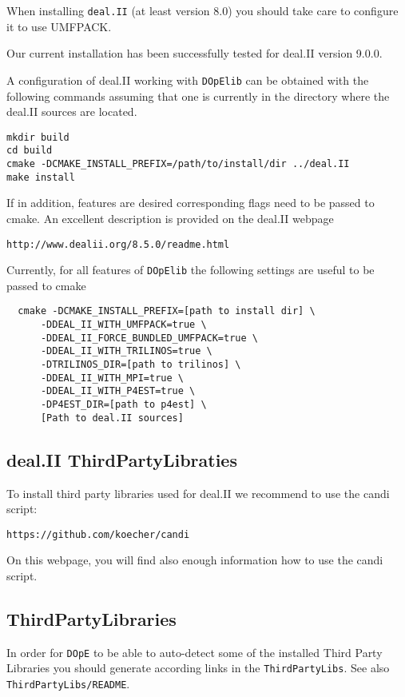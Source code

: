 When installing \texttt{deal.II} (at least version 8.0) you should take care to configure 
it to use UMFPACK.

\begin{remark}
Our current \dope{} installation has been successfully tested for deal.II version 9.0.0.
\end{remark}

A configuration of deal.II working with \texttt{DOpElib} can be obtained with
the following commands assuming that one is currently in the 
directory where the deal.II sources are located.
\begin{lstlisting}
mkdir build
cd build 
cmake -DCMAKE_INSTALL_PREFIX=/path/to/install/dir ../deal.II
make install
\end{lstlisting}
If in addition, features are desired corresponding flags need to be passed to
cmake. An excellent description is provided on the deal.II webpage
\begin{lstlisting}
http://www.dealii.org/8.5.0/readme.html
\end{lstlisting}
Currently, for all features of \texttt{DOpElib} the following settings
are useful to be passed to cmake
\begin{lstlisting}
  cmake -DCMAKE_INSTALL_PREFIX=[path to install dir] \ 
      -DDEAL_II_WITH_UMFPACK=true \
      -DDEAL_II_FORCE_BUNDLED_UMFPACK=true \
      -DDEAL_II_WITH_TRILINOS=true \
      -DTRILINOS_DIR=[path to trilinos] \
      -DDEAL_II_WITH_MPI=true \
      -DDEAL_II_WITH_P4EST=true \
      -DP4EST_DIR=[path to p4est] \
      [Path to deal.II sources]
\end{lstlisting}

\subsection{deal.II ThirdPartyLibraties}
To install third party libraries used for deal.II we recommend to use
the candi script:
\begin{lstlisting}
https://github.com/koecher/candi
\end{lstlisting}
On this webpage, you will find also enough information how to use 
the candi script.

\subsection{ThirdPartyLibraries}
In order for \texttt{DOpE} to be able to auto-detect some of the installed 
Third Party Libraries you should generate according links in the 
\texttt{ThirdPartyLibs}. See also \texttt{ThirdPartyLibs/README}.

